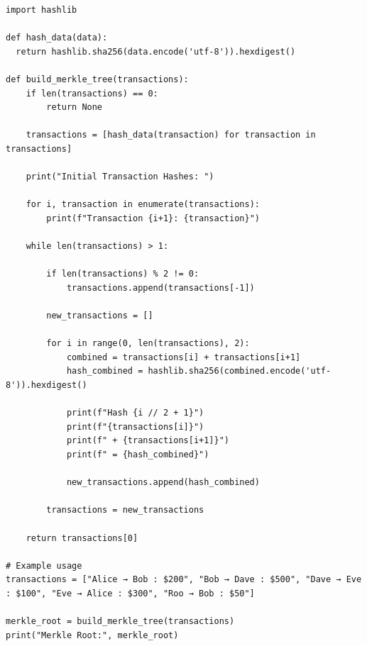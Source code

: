 \documentclass[12pt,a4paper]{article}
\begin{document}
\begin{lstlisting}[style=pythonstyle]
import hashlib

def hash_data(data):
  return hashlib.sha256(data.encode('utf-8')).hexdigest()

def build_merkle_tree(transactions):
    if len(transactions) == 0:
        return None

    transactions = [hash_data(transaction) for transaction in transactions]
    
    print("Initial Transaction Hashes: ")

    for i, transaction in enumerate(transactions):
        print(f"Transaction {i+1}: {transaction}")
    
    while len(transactions) > 1:

        if len(transactions) % 2 != 0:
            transactions.append(transactions[-1])

        new_transactions = []
        
        for i in range(0, len(transactions), 2):
            combined = transactions[i] + transactions[i+1]
            hash_combined = hashlib.sha256(combined.encode('utf-8')).hexdigest()
            
            print(f"Hash {i // 2 + 1}")
            print(f"{transactions[i]}")
            print(f" + {transactions[i+1]}")
            print(f" = {hash_combined}")

            new_transactions.append(hash_combined)

        transactions = new_transactions

    return transactions[0]

# Example usage
transactions = ["Alice → Bob : $200", "Bob → Dave : $500", "Dave → Eve : $100", "Eve → Alice : $300", "Roo → Bob : $50"]

merkle_root = build_merkle_tree(transactions)
print("Merkle Root:", merkle_root)
\end{lstlisting}
\end{document}
